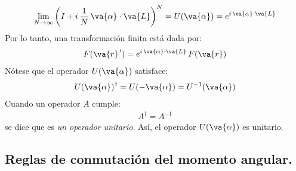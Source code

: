 \begin{align}
\lim_{N \to \infty} \left( I + i \, \dfrac{1}{N} \, \va{\alpha} \cdot \va{L} \right)^{N} = U(\va{\alpha}) = e^{i \, \va{\alpha} \cdot \va{L}}
\label{eq:ecuacion_10_100}
\end{align}
Por lo tanto, una transformación finita está dada por:
\begin{align}
F(\va{r}^{\, \prime}) = e^{i \, \va{\alpha} \cdot \va{L}} \, F(\va{r})
\label{eq:ecuacion_10_101}
\end{align}
Nótese que el operador $U(\va{\alpha})$ satisface:
\begin{align}
U(\va{\alpha})^{\dagger} = U(- \va{\alpha}) = U^{-1} (\va{\alpha})
\label{eq:ecuacion_10_102}
\end{align}
Cuando un operador $A$ cumple:
\begin{align*}
A^{\dagger} = A^{-1}
\end{align*}
se dice que es \emph{un operador unitario}. Así, el operador $U(\va{\alpha})$ es unitario.

\subsection{Reglas de conmutación del momento angular.}

